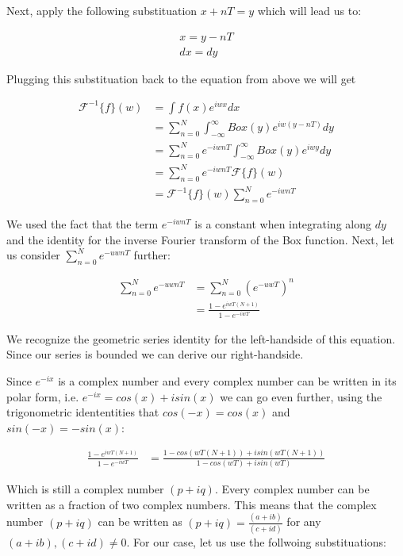 Next, apply the following substituation $x+nT = y$ which will lead us to:

\begin{gather*}
x=y-nT\\
dx=dy
\end{gather*} 

Plugging this substituation back to the equation from above we will get 

\begin{align*}
\mathcal{F}^{-1}\{f\}(w)
& =\int f(x) e^{iwx}dx\\
& =\sum_{n=0}^{N} \int_{-\infty}^{\infty} Box(y) e^{iw(y-nT)}dy \\
& =\sum_{n=0}^{N} e^{-iwnT} \int_{-\infty}^{\infty} Box(y) e^{iwy}dy \\
& =\sum_{n=0}^{N} e^{-iwnT} \mathcal{F}\{f\}(w) \\
& =\mathcal{F}^{-1}\{f\}(w) \sum_{n=0}^{N} e^{-iwnT}  
\end{align*}

We used the fact that the term $e^{-iwnT}$ is a constant when integrating along $dy$ and the identity for the inverse Fourier transform of the Box function. Next, let us consider $\sum_{n=0}^N e^{-uwnT}$ further:

\begin{align*}
\sum_{n=0}^N e^{-uwnT}
& =\sum_{n=0}^N (e^{-uwT})^n \\
& =\frac{1-e^{iwT(N+1)}}{1-e^{-iwT}}
\end{align*}

We recognize the geometric series identity for the left-handside of this equation. Since our series is bounded we can derive our right-handside.

Since $e^{-ix}$ is a complex number and every complex number can be written in its polar form, i.e. $e^{-ix} = cos(x) + i sin(x)$ we can go even further, using the trigonometric idententities that $cos(-x) = cos(x)$ and $sin(-x) = -sin(x)$:

\begin{align*}
\frac{1-e^{iwT(N+1)}}{1-e^{-iwT}}
& =\frac{1-cos(wT(N+1)) + i sin(wT(N+1)) }{1-cos(wT) + i sin(wT)}
\end{align*}

Which is still a complex number $(p+iq)$. Every complex number can be written as a fraction of two complex numbers. This means that the complex number $(p+iq)$ can be written as $(p+iq) = \frac{(a+ib)}{(c+id)}$ for any $(a+ib), (c+id) \neq 0$. 
For our case, let us use the follwoing substituations: 

